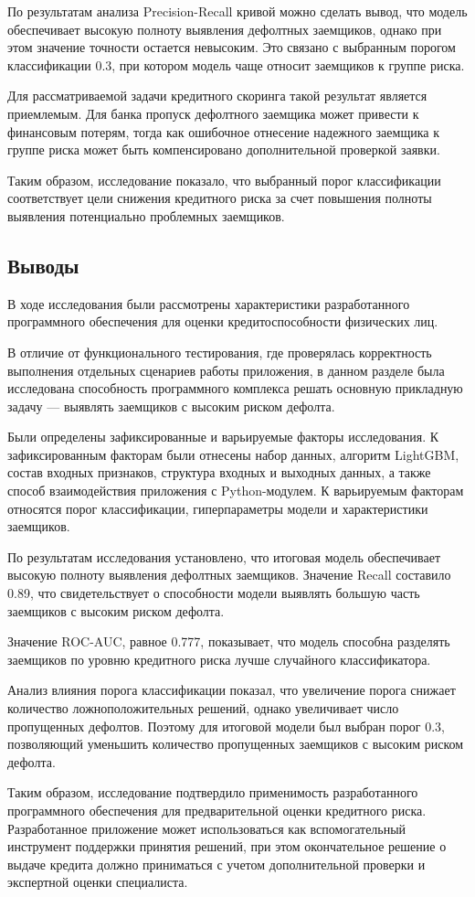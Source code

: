 По результатам анализа Precision-Recall кривой можно сделать вывод, что модель обеспечивает высокую полноту выявления дефолтных заемщиков, однако при этом значение точности остается невысоким. Это связано с выбранным порогом классификации 0.3, при котором модель чаще относит заемщиков к группе риска.

Для рассматриваемой задачи кредитного скоринга такой результат является приемлемым. Для банка пропуск дефолтного заемщика может привести к финансовым потерям, тогда как ошибочное отнесение надежного заемщика к группе риска может быть компенсировано дополнительной проверкой заявки.

Таким образом, исследование показало, что выбранный порог классификации соответствует цели снижения кредитного риска за счет повышения полноты выявления потенциально проблемных заемщиков.

\subsection{Выводы}

В ходе исследования были рассмотрены характеристики разработанного программного обеспечения для оценки кредитоспособности физических лиц.

В отличие от функционального тестирования, где проверялась корректность выполнения отдельных сценариев работы приложения, в данном разделе была исследована способность программного комплекса решать основную прикладную задачу — выявлять заемщиков с высоким риском дефолта.

Были определены зафиксированные и варьируемые факторы исследования. К зафиксированным факторам были отнесены набор данных, алгоритм LightGBM, состав входных признаков, структура входных и выходных данных, а также способ взаимодействия приложения с Python-модулем. К варьируемым факторам относятся порог классификации, гиперпараметры модели и характеристики заемщиков.

По результатам исследования установлено, что итоговая модель обеспечивает высокую полноту выявления дефолтных заемщиков. Значение Recall составило 0.89, что свидетельствует о способности модели выявлять большую часть заемщиков с высоким риском дефолта.

Значение ROC-AUC, равное 0.777, показывает, что модель способна разделять заемщиков по уровню кредитного риска лучше случайного классификатора.

Анализ влияния порога классификации показал, что увеличение порога снижает количество ложноположительных решений, однако увеличивает число пропущенных дефолтов. Поэтому для итоговой модели был выбран порог 0.3, позволяющий уменьшить количество пропущенных заемщиков с высоким риском дефолта.

Таким образом, исследование подтвердило применимость разработанного программного обеспечения для предварительной оценки кредитного риска. Разработанное приложение может использоваться как вспомогательный инструмент поддержки принятия решений, при этом окончательное решение о выдаче кредита должно приниматься с учетом дополнительной проверки и экспертной оценки специалиста.